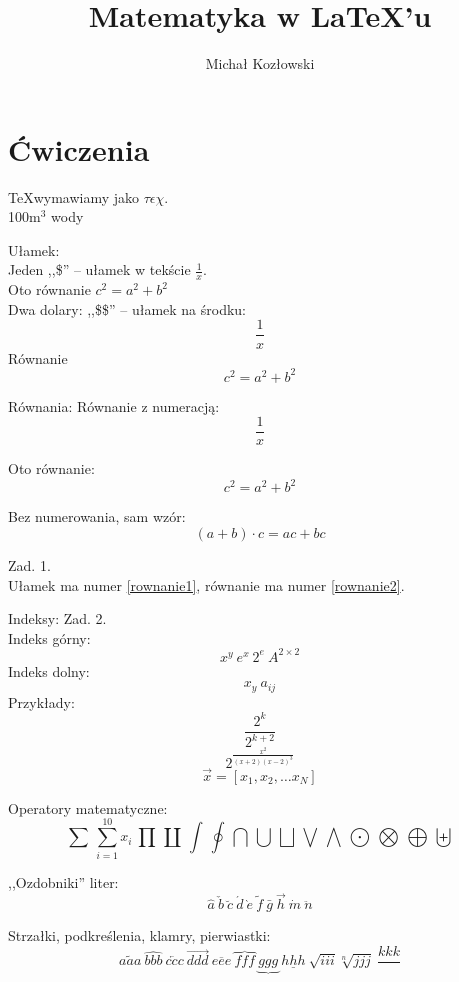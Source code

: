 ﻿\documentclass[a4paper,12pt]{article}
\title{Matematyka w LaTeX'u}
\author{Michał Kozłowski}
\begin{document}
\maketitle

\section{Ćwiczenia}

\TeX wymawiamy jako $\tau\epsilon\chi$.\\
100m$^3$ wody

Ułamek:\\
Jeden ,,\$'' -- ułamek w tekście $ \frac{1}{x} $.\\
Oto równanie $c^{2} = a^{2}+b^{2}$\\

Dwa dolary: ,,\$\$'' -- ułamek na środku: $$ \frac{1}{x} $$
Równanie $$c^{2} = a^{2}+b^{2}$$

Równania:
Równanie z numeracją:
\begin{equation}
\frac{1}{x}
\label{rownanie1}
\end{equation}

Oto równanie:
\begin{equation}
c^{2}=a^{2}+b^{2}
\label{rownanie2}
\end{equation}

Bez numerowania, sam wzór:
\begin{displaymath}
	(a+b)\cdot c=ac+bc
\end{displaymath}

Zad. 1.\\
Ułamek ma numer \eqref{rownanie1}, równanie ma numer
\eqref{rownanie2}.

Indeksy:
Zad. 2.\\
Indeks górny:
$$ x^y \ e^{x} \ 2^{e} \ A^{2 \times 2} $$
Indeks dolny:
$$ x_y \ a_{ij} $$
Przykłady:
$$ \frac{2^k}{2^{k+2}} $$
$$ 2^\frac{x^2}{(x+2)(x-2)^3}	$$
$$ \vec{x} = [x_1,x_2, \dots x_N]	$$

Operatory matematyczne:
$$ \sum \ \sum_{i=1}^{10}x_{i} \ \prod \ \coprod \ \int \ \oint \ \bigcap \ \bigcup \
	\bigsqcup \ \bigvee \ \bigwedge \ \bigodot \ \bigotimes \ \bigoplus \ \biguplus $$
	
,,Ozdobniki'' liter:\\
$$ \hat{a} \ \check{b} \ \breve{c} \ \acute{d} \ \grave{e} \ \tilde{f} \ \bar{g} \ 
	\vec{h} \ \dot{m} \ \ddot{n}$$
	
Strzałki, podkreślenia, klamry, pierwiastki:\\
$$ \widetilde{aaa} \ \widehat{bbb} \ \overleftarrow{ccc} \ \overrightarrow{ddd} \
	\overline{eee} \ \overbrace{fff} \ \underbrace{ggg} \ \underline{hhh} \
	\sqrt{iii} \sqrt[n]{jjj} \ \frac{kkk}{}$$
\end{document}
